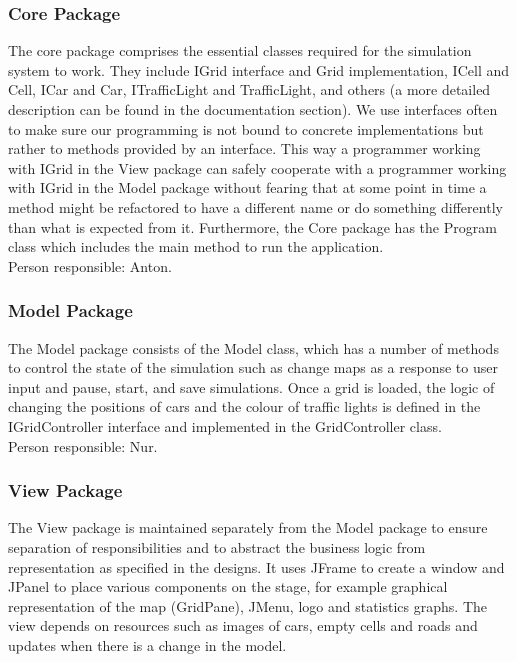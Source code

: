 \documentclass{article}
\begin{document}
	\subsubsection{Core Package}
	The core package comprises the essential classes required for the simulation system to work. They include IGrid interface and Grid implementation, ICell and Cell, ICar and Car, ITrafficLight and TrafficLight, and others (a more detailed description can be found in the documentation section). 
	We use interfaces often to make sure our programming is not bound to concrete implementations but rather to methods provided by an interface. 
	This way a programmer working with IGrid in the View package can safely cooperate with a programmer working with IGrid in the Model package without fearing that at some point in time a method might be refactored to have a different name or do something differently than what is expected from it. 
	Furthermore, the Core package has the Program class which includes the main method to run the application.\\
	
	\noindent
	Person responsible: Anton. 
	
	\subsubsection{Model Package}
	The Model package consists of the Model class, which has a number of methods to control the state of the simulation such as change maps as a response to user input and pause, start, and save simulations. 
	Once a grid is loaded, the logic of changing the positions of cars and the colour of traffic lights is defined in the IGridController interface and implemented in the GridController class.\\
	
	\noindent
	Person responsible: Nur. 
	
	\subsubsection{View Package}
	The View package is maintained separately from the Model package to ensure separation of responsibilities and to abstract the business logic from representation as specified in the designs. 
	It uses JFrame to create a window and JPanel to place various components on the stage, for example graphical representation of the map (GridPane), JMenu, logo and statistics graphs. 
	The view depends on resources such as images of cars, empty cells and roads and updates when there is a change in the model.\\
	
\end{document}
